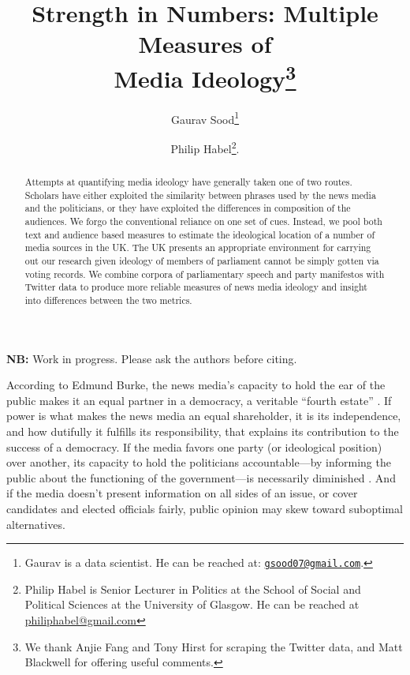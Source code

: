 \documentclass[12pt, letterpaper]{article}
\title{Strength in Numbers: Multiple Measures of \\Media Ideology\footnote{We thank Anjie Fang and Tony Hirst for scraping the Twitter data, and Matt Blackwell for offering useful comments.}}
\author{Gaurav Sood\thanks{Gaurav is a data scientist. He can be reached at: \href{mailto:gsood07@gmail.com}{\texttt{gsood07@gmail.com}}.} \and Philip Habel\thanks{Philip Habel is Senior Lecturer in Politics at the School of Social and Political Sciences at the University of Glasgow. He can be reached at \href{mailto:philiphabel@gmail.com}{philiphabel@gmail.com}}.}
\begin{document}
\maketitle

\begin{center}
\vspace{1cm}\textbf{NB:} Work in progress. Please ask the authors before citing.\\\vspace{1cm}
\end{center}

\begin{abstract}

\noindent Attempts at quantifying media ideology have generally taken one of two routes. Scholars have either exploited the similarity between phrases used by the news media and the politicians, or they have exploited the differences in composition of the audiences. We forgo the conventional reliance on one set of cues. Instead, we pool both text and audience based measures to estimate the ideological location of a number of media sources in the UK. The UK presents an appropriate environment for carrying out our research given ideology of members of parliament cannot be simply gotten via voting records. We combine corpora of parliamentary speech and party manifestos with Twitter data to produce more reliable measures of news media ideology and insight into differences between the two metrics.
\end{abstract}

\newpage
\doublespacing

According to Edmund Burke, the news media's capacity to hold the ear of the public makes it an equal partner in a democracy, a veritable ``fourth estate'' \citep{carlyle2003heroes}.  If power is what makes the news media an equal shareholder, it is its independence, and how dutifully it fulfills its responsibility, that explains its contribution to the success of a democracy. If the media favors one party (or ideological position) over another, its capacity to hold the politicians accountable---by informing the public about the functioning of the government---is necessarily diminished \citep[see, for e.g.,][]{larcinese2011}. And if the media doesn't present information on all sides of an issue, or cover candidates and elected officials fairly, public opinion may skew toward suboptimal alternatives.
\end{document}
